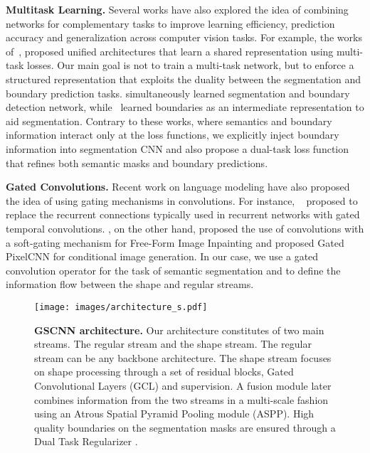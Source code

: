 \documentclass[10pt,twocolumn,letterpaper]{article}
\begin{document}
\vspace{1mm}
\noindent \textbf{Multitask Learning.}
Several works have also explored the idea of 
combining networks for complementary tasks to improve learning efficiency, prediction accuracy and generalization across computer vision tasks.
For example, the works of~\cite{teichmann2018multinet,misra2016cross,kokkinos2017ubernet,kendall2018multi, kong2018recurrent}, proposed unified architectures that learn a shared representation using multi-task losses.
Our main goal is not to train a multi-task network, but to enforce a structured representation that exploits the duality between the segmentation and boundary prediction tasks. 
 \cite{cheng2017fusionnet, bertasius2016semantic} 
 simultaneously learned segmentation and boundary detection network, while~\cite{lin2017refinenet, peng2017large} learned boundaries as an intermediate representation to aid segmentation. Contrary to these works, where semantics and boundary information interact only at the loss functions, we explicitly inject boundary information into segmentation CNN and also propose a dual-task loss function that refines both semantic masks and boundary predictions.
 
\vspace{1mm}
\noindent \textbf{Gated Convolutions.} Recent work on language modeling have also proposed the idea of using 
gating mechanisms in convolutions. For instance, ~\cite{dauphin2017language} proposed to
replace the recurrent connections typically used in recurrent networks with gated temporal convolutions. 
\cite{yu2018free}, on the other hand, proposed the use of convolutions with a soft-gating mechanism for  Free-Form Image Inpainting and \cite{van2016conditional} proposed Gated PixelCNN for conditional image generation.
In our case, we use a gated convolution operator for the task of semantic segmentation and to define the information flow between the shape and regular streams. 

\begin{figure*}[t!]
\vspace{-2mm}
\centering
\texttt{[image: images/architecture\_s.pdf]}
\vspace{-7mm}
\caption{
	{\bf GSCNN architecture.} Our architecture constitutes of two main streams. The regular stream and the shape stream.
The regular stream can be any backbone architecture. The shape stream focuses on shape processing  through a set of residual blocks, Gated Convolutional Layers (GCL) and supervision. 
A fusion module later combines information from the two streams in a multi-scale fashion using an Atrous Spatial Pyramid Pooling module (ASPP). High quality boundaries on the segmentation masks are ensured through a Dual Task Regularizer . 
 }
\label{fig:nms_layer}
\vspace{-2.5mm}
\end{figure*}
\end{document}
